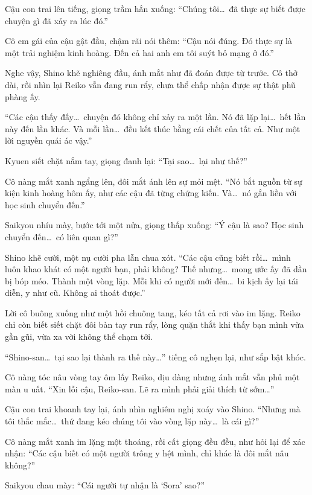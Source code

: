 \documentclass[../main.tex]{subfiles}
\begin{document}
Cậu con trai lên tiếng, giọng trầm hẳn xuống: ``Chúng tôi\dots\ đã thực sự biết được chuyện gì đã xảy ra lúc đó.''

Cô em gái của cậu gật đầu, chậm rãi nói thêm: ``Cậu nói đúng. Đó thực sự là một trải nghiệm kinh hoàng. Đến cả hai anh em tôi suýt bỏ mạng ở đó.''

Nghe vậy, Shino khẽ nghiêng đầu, ánh mắt như đã đoán được từ trước. Cô thở dài, rồi nhìn lại Reiko vẫn đang run rẩy, chưa thể chấp nhận được sự thật phũ phàng ấy.

``Các cậu thấy đấy\dots\ chuyện đó không chỉ xảy ra một lần. Nó đã lặp lại\dots\ hết lần này đến lần khác. Và mỗi lần\dots\ đều kết thúc bằng cái chết của tất cả. Như một lời nguyền quái ác vậy.''

Kyuen siết chặt nắm tay, giọng đanh lại: ``Tại sao\dots\ lại như thế?''

Cô nàng mắt xanh ngẩng lên, đôi mắt ánh lên sự mỏi mệt. ``Nó bắt nguồn từ sự kiện kinh hoàng hôm ấy, như các cậu đã từng chứng kiến. Và\dots\ nó gắn liền với học sinh chuyển đến.''

Saikyou nhíu mày, bước tới một nửa, giọng thấp xuống: ``Ý cậu là sao? Học sinh chuyển đến\dots\ có liên quan gì?''

Shino khẽ cười, một nụ cười pha lẫn chua xót. ``Các cậu cũng biết rồi\dots\ mình luôn khao khát có một người bạn, phải không? Thế nhưng\dots\ mong ước ấy đã dần bị bóp méo. Thành một vòng lặp. Mỗi khi có người mới đến\dots\ bi kịch ấy lại tái diễn, y như cũ. Không ai thoát được.''

Lời cô buông xuống như một hồi chuông tang, kéo tất cả rơi vào im lặng. Reiko chỉ còn biết siết chặt đôi bàn tay run rẩy, lòng quặn thắt khi thấy bạn mình vừa gần gũi, vừa xa vời không thể chạm tới.

``Shino-san\dots\ tại sao lại thành ra thế này\dots'' tiếng cô nghẹn lại, như sắp bật khóc.

Cô nàng tóc nâu vòng tay ôm lấy Reiko, dịu dàng nhưng ánh mắt vẫn phủ một màn u uất. ``Xin lỗi cậu, Reiko-san. Lẽ ra mình phải giải thích từ sớm\dots''

Cậu con trai khoanh tay lại, ánh nhìn nghiêm nghị xoáy vào Shino. ``Nhưng mà tôi thắc mắc\dots\ thứ đang kéo chúng tôi vào vòng lặp này\dots\ là cái gì?''

Cô nàng mắt xanh im lặng một thoáng, rồi cất giọng đều đều, như hỏi lại để xác nhận: ``Các cậu biết có một người trông y hệt mình, chỉ khác là đôi mắt nâu không?''

Saikyou chau mày: ``Cái người tự nhận là `Sora' sao?''
\end{document}
